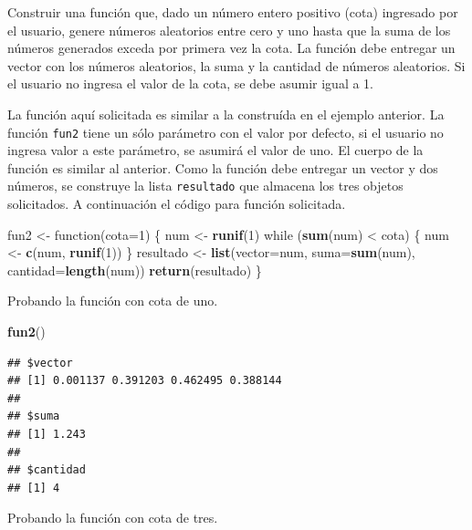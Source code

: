 \documentclass[10pt,]{krantz}
\makeatletter
\newenvironment{Shaded}{\begin{snugshade}}{\end{snugshade}}
\newcommand{\KeywordTok}[1]{\textcolor[rgb]{0.13,0.29,0.53}{\textbf{{#1}}}}
\newcommand{\DataTypeTok}[1]{\textcolor[rgb]{0.13,0.29,0.53}{{#1}}}
\newcommand{\DecValTok}[1]{\textcolor[rgb]{0.00,0.00,0.81}{{#1}}}
\newcommand{\StringTok}[1]{\textcolor[rgb]{0.31,0.60,0.02}{{#1}}}
\newcommand{\NormalTok}[1]{{#1}}
\newenvironment{kframe}{%
\medskip{}
\setlength{\fboxsep}{.8em}
 \def\at@end@of@kframe{}%
 \ifinner\ifhmode%
  \def\at@end@of@kframe{\end{minipage}}%
  \begin{minipage}{\columnwidth}%
 \fi\fi%
 \def\FrameCommand##1{\hskip\@totalleftmargin \hskip-\fboxsep
 \colorbox{shadecolor}{##1}\hskip-\fboxsep
     \hskip-\linewidth \hskip-\@totalleftmargin \hskip\columnwidth}%
 \MakeFramed {\advance\hsize-\width
   \@totalleftmargin\z@ \linewidth\hsize
   \@setminipage}}%
 {\par\unskip\endMakeFramed%
 \at@end@of@kframe}
\renewenvironment{Shaded}{\begin{kframe}}{\end{kframe}}
\makeatother
\begin{document}
Construir una función que, dado un número entero positivo (cota)
ingresado por el usuario, genere números aleatorios entre cero y uno
hasta que la suma de los números generados exceda por primera vez la
cota. La función debe entregar un vector con los números aleatorios, la
suma y la cantidad de números aleatorios. Si el usuario no ingresa el
valor de la cota, se debe asumir igual a 1.

La función aquí solicitada es similar a la construída en el ejemplo
anterior. La función \texttt{fun2} tiene un sólo parámetro con el valor
por defecto, si el usuario no ingresa valor a este parámetro, se asumirá
el valor de uno. El cuerpo de la función es similar al anterior. Como la
función debe entregar un vector y dos números, se construye la lista
\texttt{resultado} que almacena los tres objetos solicitados. A
continuación el código para función solicitada.

\begin{Shaded}
\begin{Highlighting}[]
\NormalTok{fun2 <-}\StringTok{ }\NormalTok{function(}\DataTypeTok{cota=}\DecValTok{1}\NormalTok{) \{}
  \NormalTok{num <-}\StringTok{ }\KeywordTok{runif}\NormalTok{(}\DecValTok{1}\NormalTok{)}
  \NormalTok{while (}\KeywordTok{sum}\NormalTok{(num) <}\StringTok{ }\NormalTok{cota) \{}
    \NormalTok{num <-}\StringTok{ }\KeywordTok{c}\NormalTok{(num, }\KeywordTok{runif}\NormalTok{(}\DecValTok{1}\NormalTok{))}
  \NormalTok{\}}
  \NormalTok{resultado <-}\StringTok{ }\KeywordTok{list}\NormalTok{(}\DataTypeTok{vector=}\NormalTok{num,}
                    \DataTypeTok{suma=}\KeywordTok{sum}\NormalTok{(num),}
                    \DataTypeTok{cantidad=}\KeywordTok{length}\NormalTok{(num))}
  \KeywordTok{return}\NormalTok{(resultado)}
\NormalTok{\}}
\end{Highlighting}
\end{Shaded}

Probando la función con cota de uno.

\begin{Shaded}
\begin{Highlighting}[]
\KeywordTok{fun2}\NormalTok{()}
\end{Highlighting}
\end{Shaded}

\begin{verbatim}
## $vector
## [1] 0.001137 0.391203 0.462495 0.388144
## 
## $suma
## [1] 1.243
## 
## $cantidad
## [1] 4
\end{verbatim}

Probando la función con cota de tres.
\end{document}
